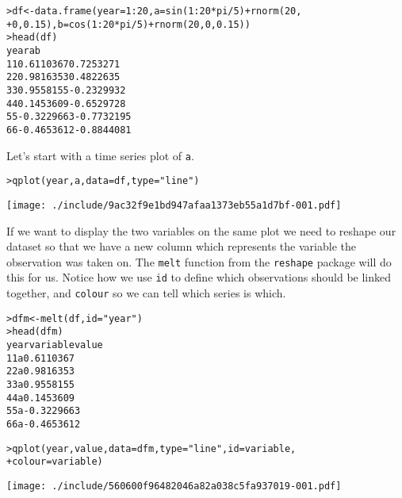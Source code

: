 \begin{alltt}
> df <- data.frame(year = 1:20, a = sin(1:20 * pi/5) + rnorm(20, 
+     0, 0.15), b = cos(1:20 * pi/5) + rnorm(20, 0, 0.15))
> head(df)
  year          a          b
1    1  0.6110367  0.7253271
2    2  0.9816353  0.4822635
3    3  0.9558155 -0.2329932
4    4  0.1453609 -0.6529728
5    5 -0.3229663 -0.7732195
6    6 -0.4653612 -0.8844081

\end{alltt}

Let's start with a time series plot of {\tt a}.

\begin{alltt}
> qplot(year, a, data = df, type = "line")
\end{alltt}
\texttt{[image: ./include/9ac32f9e1bd947afaa1373eb55a1d7bf-001.pdf]}
\begin{alltt}

\end{alltt}

If we want to display the two variables on the same plot we need to reshape our dataset so that we have a new column which represents the variable the observation was taken on.  The {\tt melt} function from the {\tt reshape} package will do this for us.  Notice how we use {\tt id} to define which observations should be linked together, and {\tt colour} so we can tell which series is which.

\begin{alltt}
> dfm <- melt(df, id = "year")
> head(dfm)
  year variable      value
1    1        a  0.6110367
2    2        a  0.9816353
3    3        a  0.9558155
4    4        a  0.1453609
5    5        a -0.3229663
6    6        a -0.4653612

> qplot(year, value, data = dfm, type = "line", id = variable, 
+     colour = variable)
\end{alltt}
\texttt{[image: ./include/560600f96482046a82a038c5fa937019-001.pdf]}
\begin{alltt}

\end{alltt}

